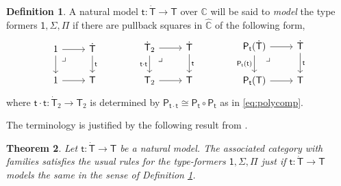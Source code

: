 \documentclass[12pt,reqno]{amsart}
\newcommand{\C}{\ensuremath{\mathbb{C}}}
\newcommand{\alg}[1]{\ensuremath{\mathsf{#1}}}
\renewcommand{\to}{\ensuremath{\rightarrow}}
\renewcommand{\t}{\ensuremath{\mathsf{t}}}
\newcommand{\tT}{\ensuremath{{\t}:\TT\to\T}}
\newcommand{\T}{\ensuremath{\mathsf{T}}}
\newcommand{\TT}{\ensuremath{\dot{\mathsf{T}}}}
\newcommand{\pbcorner}{\arrow[dr,phantom,"\lrcorner" very near start, shift right=.5ex]} %
\newtheorem{theorem}{Theorem}
\theoremstyle{remark}
\theoremstyle{definition}
\newtheorem{definition}[theorem]{Definition}
\begin{document}
\begin{definition}\label{def:modelthetypeformers}
A natural model $\tT$ over $\C$ will be said to \emph{model} the type formers $ \mathsf{1}, \Sigma, \Pi$ if there are pullback squares in $\widehat{\C}$ of the following form,
%
\begin{equation}\label{diag:naturalmodelPiSigma1}
\begin{tikzcd}
	1 \ar[r] \ar[d] \pbcorner &  \TT \ar[d, "\t"]\\  
	1 \ar[r] & \T
 \end{tikzcd} \qquad \qquad 
 \begin{tikzcd}
	\TT_2  \ar[r] \ar[d,swap,"\t\cdot\t"] \pbcorner &  \TT \ar[d, "\t"]\\  
	\T_2 \ar[r] & \T
	 \end{tikzcd} \qquad \qquad 
	 \begin{tikzcd}
	 \alg{P}_\t(\TT) \ar[r] \ar[d,swap,"\alg{P}_\t(\t)"] \pbcorner &  \TT \ar[d, "\t"]\\  
	\alg{P}_\t(\T) \ar[r] & \T
 \end{tikzcd} 
 \end{equation}
%
where $\t\cdot\t : \dot{\T}_2 \to \T_2$ is determined by $\alg{P}_{\t\cdot\t} \cong  \alg{P}_{\t} \circ \alg{P}_{\t}$ as in \eqref{eq:polycomp}.
\end{definition}
%
The terminology is justified by the following result from \cite[Theorem 16]{awodey:NM}.
%
\begin{theorem}\label{thm:nmcwf}
Let $\tT$ be a natural model. The associated category with families satisfies the usual rules for the type-formers $\mathsf{1}, \Sigma, \Pi$ just if $\tT$ models the same in the sense of Definition \ref{def:modelthetypeformers}.
\end{theorem}
\end{document}
